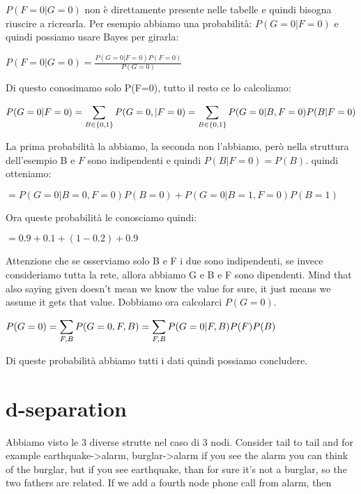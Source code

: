 $P(F=0\vert G=0)$ non è direttamente presente nelle tabelle e quindi bisogna riuscire a ricrearla.\newline
Per esempio abbiamo una probabilità: $P(G=0\vert F=0)$ e quindi possiamo usare Bayes per girarla:
\begin{center}
	$\displaystyle P(F=0\vert G=0)=\frac{P(G=0\vert F=0)P(F=0)}{P(G=0)}$
\end{center}
Di questo conosimamo solo P(F=0), tutto il resto ce lo calcoliamo:
\begin{center}
	$\displaystyle P(G=0\vert F=0)= \displaystyle\sum_{B \in \{0,1\}} P(G=0, \vert F=0) =
					\displaystyle\sum_{B \in\{0,1\}}P(G=0\vert B,F=0)P(B\vert F=0)$
\end{center}
La prima probabilità la abbiamo, la seconda non l'abbiamo, però nella struttura dell'esempio B e $F$ sono indipendenti e quindi $P(B\vert F=0)=P(B)$. quindi otteniamo:
\begin{center}
	$\displaystyle =P(G=0\vert B=0, F=0)P(B=0)+P(G=0\vert B=1, F=0)P(B=1)$
\end{center}
Ora queste probabilità le conosciamo quindi:
\begin{center}
	$\displaystyle =0.9+0.1+(1-0.2)+0.9$
\end{center}
Attenzione che se osserviamo solo B e F i due sono indipendenti, se invece consideriamo tutta la rete, allora abbiamo G e B e F sono dipendenti. Mind that also saying given doesn't mean we know the value for sure, it just means we assume it gets that value. \newline
Dobbiamo ora calcolarci $P(G=0)$. 
\begin{center}
	$\displaystyle P(G=0)=\displaystyle\sum_{F,B}P(G=0, F, B)=\displaystyle\sum_{F,B}P(G=0\vert F, B)P(F)P(B)$
\end{center}
Di queste probabilità abbiamo tutti i dati quindi possiamo concludere.\newline
\section{d-separation}
Abbiamo visto le 3 diverse strutte nel caso di 3 nodi. Consider tail to tail and for example earthquake->alarm, burglar->alarm if you see the alarm you can think of the burglar, but if you see earthquake, than for sure it's not a burglar, so the two fathers are related. \newline
If we add a fourth node phone call from alarm, then
